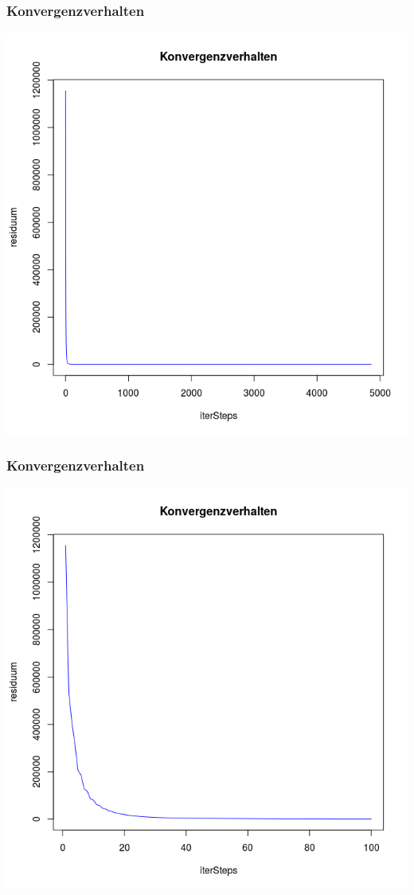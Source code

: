 \documentclass[]{beamer}
\begin{document}
\begin{frame}
\frametitle{Konvergenzverhalten}
\begin{center}
\includegraphics[scale=0.3]{Konvergenzverhalten_ganz.png}
\end{center}
\end{frame}

\begin{frame}
\frametitle{Konvergenzverhalten}
\begin{center}
\includegraphics[scale=0.33]{Konvergenzverhalten_1_100.png}
\end{center}
\end{frame}
\end{document}
